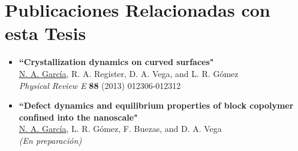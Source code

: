 \documentclass[../tesis.tex]{subfiles}
\begin{document}
\chapter*{Publicaciones Relacionadas con esta Tesis} %

\begin{itemize}

\item{\textbf{``Crystallization dynamics on curved surfaces"} \\
     \underline{N. A. García}, R. A. Register, D. A. Vega, and L. R. Gómez \\
     \emph{Physical Review E} \textbf{88} (2013) 012306-012312}


\item{\textbf{``Defect dynamics and equilibrium properties of block copolymer confined into the nanoscale"} \\
     \underline{N. A. García}, L. R. Gómez, F. Buezas, and D. A. Vega \\
     \emph{(En preparación)}}


\end{itemize} 
\end{document}
